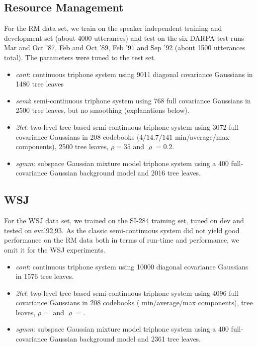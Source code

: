 \documentclass{article}
\begin{document}
\subsection{Resource Management}
For the RM data set, we train on the speaker independent training and development 
set (about 4000 utterances) and test on the six DARPA test runs Mar and Oct '87,
Feb and Oct '89, Feb '91 and Sep '92 (about 1500 utterances total).  The parameters 
were tuned to the test set.
%
\begin{itemize}
\item
  {\em cont}: continuous triphone system using 9011 diagonal covariance
  Gaussians in 1480 tree leaves
\item
  {\em semi}: semi-continuous triphone system using 768 full covariance
  Gaussians in 2500 tree leaves, but no smoothing (explanations below).
\item
  {\em 2lvl}: two-level tree based semi-continuous triphone system using
  3072 full covariance Gaussians in 208 codebooks ($4/14.7/141$ min/average/max
  components), 2500 tree leaves, $\rho = 35$ and $\varrho = 0.2$.
\item
  {\em sgmm}: subspace Gaussian mixture model triphone system using a 400 
  full-covariance Gaussian background model and 2016 tree leaves.
\end{itemize}

\subsection{WSJ}
For the WSJ data set, we trained on the SI-284 training set, tuned on dev
and tested on eval92,93.
As the classic semi-continuous system did not yield good performance on the
RM data both in terms of run-time and performance, we omit it for the WSJ
experiments.
%
\begin{itemize}
\item
  {\em cont}: continuous triphone system using 10000 diagonal covariance
  Gaussians in 1576 tree leaves.
\item
  {\em 2lvl}: two-level tree based semi-continuous triphone system using
  4096 full covariance Gaussians in 208 codebooks ( min/average/max
  components),  tree leaves, $\rho = $ and $\varrho = $.
\item
  {\em sgmm}: subspace Gaussian mixture model triphone system using a 400 
  full-covariance Gaussian background model and 2361 tree leaves.
\end{itemize}
\end{document}
